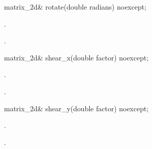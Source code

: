 \begin{itemdecl}
matrix_2d& rotate(double radians) noexcept;
\end{itemdecl}
\begin{itemdescr}
	\pnum
	\effects
	.
	
	\pnum
	\returns
	.
\end{itemdescr}

\begin{itemdecl}
matrix_2d& shear_x(double factor) noexcept;
\end{itemdecl}
\begin{itemdescr}
	\pnum
	\effects
	.
	
	\pnum
	\returns
	.
\end{itemdescr}

\begin{itemdecl}
matrix_2d& shear_y(double factor) noexcept;
\end{itemdecl}
\begin{itemdescr}
	\pnum
	\effects
	.
	
	\pnum
	\returns
	.
\end{itemdescr}

